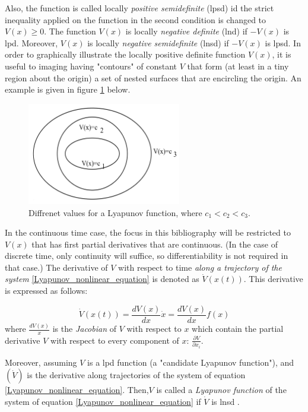 \documentclass{thesisreport}
\begin{document}
Also, the function is called locally \textit{positive semidefinite} (lpsd) id the strict inequality applied on the function in the second condition is changed to $V(x) \geq 0$. The function $V(x)$ is locally \textit{negative definite} (lnd) if $-V(x)$ is lpd. Moreover, $V(x)$ is locally \textit{negative semidefinite} (lnsd) if $-V(x)$ is lpsd. In order to graphically illustrate the locally positive definite function $V(x)$, it is useful to imaging having "contours" of constant $V$ that form (at least in a tiny region about the origin) a set of nested surfaces that are encircling the origin. An example is given in figure \ref{Lyapunov_figure} below. 


\begin{figure}[h]
\centering
\includegraphics[width=0.6\textwidth]{Images/Control/Lyapunov_function}
\caption{Diffrenet values for a Lyapunov function, where $c_1<c_2<c_3$. \cite{Dahleh2011}}
\label{Lyapunov_figure}
\end{figure}

In the continuous time case, the focus in this bibliography will be restricted to $V(x)$ that has first partial derivatives that are continuous. (In the case of discrete time, only continuity will suffice, so differentiability is not required in that case.) The derivative of $V$ with respect to time \textit{along a trajectory of the system} \ref{Lyapunov_nonlinear_equation} is denoted as $\dot{V}(x(t))$. This derivative is expressed as follows:

\begin{equation}
\dot{V}(x(t)) = \frac{dV(x)}{dx}\dot{x} = \frac{dV(x)}{dx}f(x)
\end{equation}
where 
$\frac{dV(x)}{x}$ is the \textit{Jacobian} of $V$ with respect to $x$ which contain the partial derivative $V$ with respect to every component of $x$: $\frac{\partial V}{\partial x_i}$.

Moreover, assuming $V$ is a lpd function (a "candidate Lyapunov function"), and $(\dot{V})$ is the derivative along trajectories of the system of equation \ref{Lyapunov_nonlinear_equation}. Then,$V$ is called a \textit{Lyapunov function} of the system of equation \ref{Lyapunov_nonlinear_equation} if $\dot{V}$ is lnsd \cite{Dahleh2011}.
\end{document}
